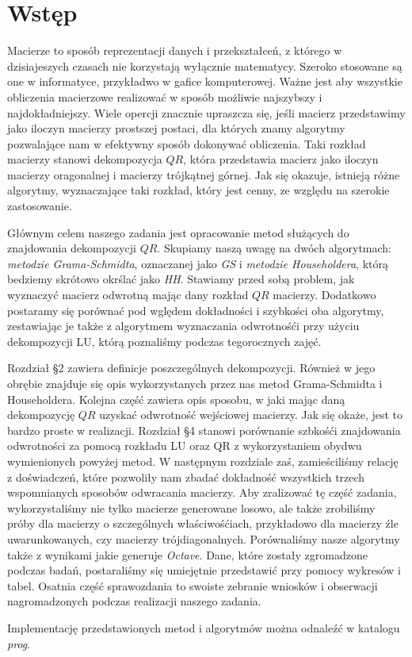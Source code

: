 \section{Wstęp}
Macierze to sposób reprezentacji danych i przekształceń, z którego w dzisiajeszych
czasach nie korzystają wyłącznie matematycy. Szeroko stosowane są one
w informatyce, przykładwo w gafice komputerowej. Ważne jest aby wszystkie
obliczenia macierzowe realizować w sposób możliwie najszybszy i najdokładniejszy.
Wiele opercji znacznie upraszcza się, jeśli macierz przedstawimy jako
iloczyn macierzy prostszej postaci, dla których znamy algorytmy pozwalające
nam w efektywny sposób dokonywać obliczenia. Taki rozkład macierzy stanowi
dekompozycja $QR$, która przedstawia macierz jako iloczyn macierzy oragonalnej
i macierzy trójkątnej górnej. Jak się okazuje, istnieją różne algorytmy,
wyznaczające taki rozkład, który jest cenny, ze względu na szerokie zastosowanie.

Głównym celem naszego zadania jest opracowanie metod służących do
znajdowania dekompozycji $QR$. Skupiamy naszą uwagę na dwóch algorytmach: \textit{metodzie Grama-Schmidta},
oznaczanej jako \textit{GS}
i \textit{metodzie Householdera},
którą bedziemy skrótowo okrślać jako \textit{HH}. Stawiamy przed sobą problem, jak wyznaczyć
macierz odwrotną mając dany rozkład $QR$ macierzy. Dodatkowo postaramy się
porównać pod wględem dokładności i szybkości oba algorytmy,
zestawiając je także z algorytmem wyznaczania odwrotnośći przy użyciu
dekompozycji LU, którą poznaliśmy podczas tegorocznych zajęć.

Rozdział \S2 zawiera definicje poszczególnych dekompozycji. Również w jego
obrębie znajduje się opis wykorzystanych przez nas metod Grama-Schmidta i Householdera.
Kolejna część zawiera opis sposobu, w jaki mając daną dekompozycję $QR$
uzyskać odwrotność wejściowej macierzy. Jak się okaże, jest to bardzo proste
w realizacji. Rozdział \S4 stanowi porównanie szbkośći znajdowania
odwrotności za pomocą rozkładu LU oraz QR z wykorzystaniem obydwu
wymienionych powyżej metod. W następnym rozdziale zaś, zamieściliśmy
relację z doświadczeń, które pozwoliły nam zbadać dokładność wszystkich
trzech wspomnianych sposobów odwracania macierzy. Aby zralizować
tę część zadania, wykorzystaliśmy nie tylko macierze generowane losowo, ale
także zrobiliśmy próby dla macierzy o szczególnych właściwośćiach,
przykładowo dla macierzy źle uwarunkowanych, czy macierzy trójdiagonalnych.
Porównaliśmy nasze algorytmy także z wynikami jakie generuje \textit{Octave}.
Dane, które zostały zgromadzone podczas badań, postaraliśmy się
umiejętnie przedstawić przy pomocy wykresów i tabel.
Osatnia część sprawozdania to swoiste zebranie wniosków i obserwacji
nagromadzonych podczas realizacji naszego zadania.

Implementację przedstawionych metod i algorytmów można odnaleźć w katalogu \textit{prog}.



